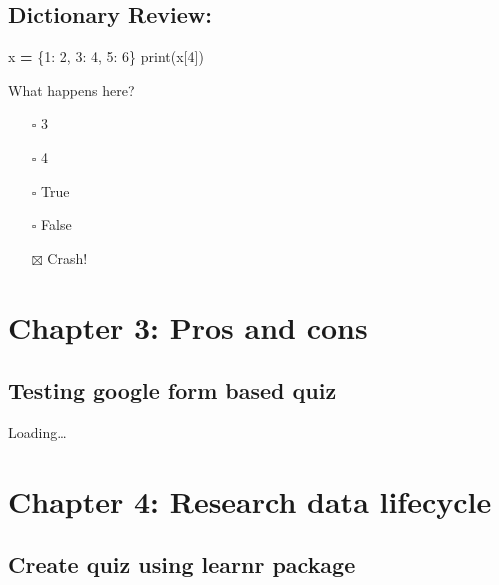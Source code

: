 \documentclass[
]{book}
\newenvironment{Shaded}{\begin{snugshade}}{\end{snugshade}}
\newcommand{\BuiltInTok}[1]{#1}
\newcommand{\DecValTok}[1]{\textcolor[rgb]{0.00,0.00,0.81}{#1}}
\newcommand{\NormalTok}[1]{#1}
\newcommand{\OperatorTok}[1]{\textcolor[rgb]{0.81,0.36,0.00}{\textbf{#1}}}
\providecommand{\tightlist}{%
  \setlength{\itemsep}{0pt}\setlength{\parskip}{0pt}}
\theoremstyle{definition}
\theoremstyle{definition}
\theoremstyle{definition}
\theoremstyle{definition}
\theoremstyle{remark}
\begin{document}
\hypertarget{dictionary-review}{%
\section{Dictionary Review:}\label{dictionary-review}}

\begin{Shaded}
\begin{Highlighting}[]
\NormalTok{x }\OperatorTok{=}\NormalTok{ \{}\DecValTok{1}\NormalTok{: }\DecValTok{2}\NormalTok{, }\DecValTok{3}\NormalTok{: }\DecValTok{4}\NormalTok{, }\DecValTok{5}\NormalTok{: }\DecValTok{6}\NormalTok{\}}
\BuiltInTok{print}\NormalTok{(x[}\DecValTok{4}\NormalTok{])}
\end{Highlighting}
\end{Shaded}

What happens here?

\begin{itemize}
\tightlist
\item[$\square$]
  3
\item[$\square$]
  4
\item[$\square$]
  True
\item[$\square$]
  False
\item[$\boxtimes$]
  Crash!
\end{itemize}

\hypertarget{chapter-3-pros-and-cons}{%
\chapter{Chapter 3: Pros and cons}\label{chapter-3-pros-and-cons}}

\hypertarget{testing-google-form-based-quiz}{%
\section{Testing google form based quiz}\label{testing-google-form-based-quiz}}

Loading\ldots{}

\hypertarget{chapter-4-research-data-lifecycle}{%
\chapter{Chapter 4: Research data lifecycle}\label{chapter-4-research-data-lifecycle}}

\hypertarget{create-quiz-using-learnr-package}{%
\section{Create quiz using learnr package}\label{create-quiz-using-learnr-package}}
\end{document}
